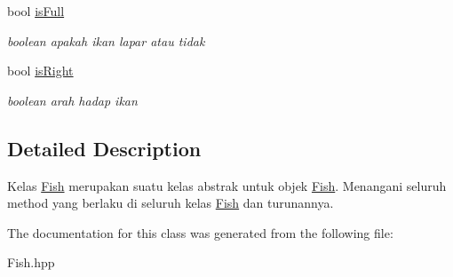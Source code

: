 \begin{DoxyCompactItemize}
\mbox{\label{classFish_af2e4a0561696f400efbb196c937f04cb}} 
bool \hyperlink{classFish_af2e4a0561696f400efbb196c937f04cb}{is\+Full}
\begin{DoxyCompactList}\small\item\em boolean apakah ikan lapar atau tidak \end{DoxyCompactList}\item 
\mbox{\label{classFish_a24723b3118965b94d4be7a48e31d482b}} 
bool \hyperlink{classFish_a24723b3118965b94d4be7a48e31d482b}{is\+Right}
\begin{DoxyCompactList}\small\item\em boolean arah hadap ikan \end{DoxyCompactList}\end{DoxyCompactItemize}


\subsection{Detailed Description}
Kelas \hyperlink{classFish}{Fish} merupakan suatu kelas abstrak untuk objek \hyperlink{classFish}{Fish}. Menangani seluruh method yang berlaku di seluruh kelas \hyperlink{classFish}{Fish} dan turunannya. 

The documentation for this class was generated from the following file\+:\begin{DoxyCompactItemize}
\item 
Fish.\+hpp\end{DoxyCompactItemize}
